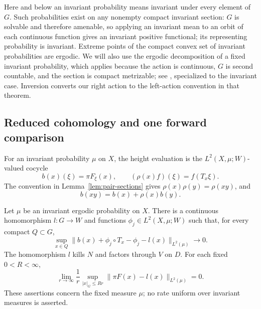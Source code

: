Here and below an invariant probability means invariant under every
element of $G$.  Such probabilities exist on any nonempty compact
invariant section: $G$ is solvable and therefore amenable, so applying
an invariant mean to an orbit of each continuous function gives an
invariant positive functional; its representing probability is
invariant.  Extreme points of the compact convex set of invariant
probabilities are ergodic.  We will also use the ergodic decomposition
of a fixed invariant probability, which applies because the action is
continuous, $G$ is second countable, and the section is compact
metrizable; see \cite[Theorem~5.2]{GreschonigSchmidt2000}, specialized
to the invariant case. Inversion converts our right action to the
left-action convention in that theorem.

\subsection{Reduced cohomology and one forward comparison}

For an invariant probability $\mu$ on $X$, the height evaluation is the
$L^2(X,\mu;W)$-valued cocycle
\[
 b(x)(\xi)=\pi F_\xi(x),\qquad
 (\rho(x)f)(\xi)=f(T_x\xi).
\]
The convention in Lemma~\ref{lem:pair-sections} gives
$\rho(x)\rho(y)=\rho(xy)$, and
\begin{equation}\label{eq:height-cocycle}
 b(xy)=b(x)+\rho(x)b(y).
\end{equation}

\begin{lemma}
\label{lem:cohomological-slope}
Let $\mu$ be an invariant ergodic probability on $X$.  There is a
continuous homomorphism $l:G\to W$ and functions
$\phi_j\in L^2(X,\mu;W)$ such that, for every compact $Q\subset G$,
\begin{equation}\label{eq:compact-coboundaries}
 \sup_{x\in Q}
 \bigl\|b(x)+\phi_j\circ T_x-\phi_j-l(x)\bigr\|_{L^2(\mu)}
 \longrightarrow0.
\end{equation}
The homomorphism $l$ kills $N$ and factors through $V$ on $D$.
For each fixed $0<R<\infty$,
\begin{equation}\label{eq:stationary-sublinear}
 \lim_{r\to\infty}\frac1r\sup_{|x|_G\le Rr}
 \|\pi F(x)-l(x)\|_{L^2(\mu)}=0.
\end{equation}
These assertions concern the fixed measure $\mu$; no rate uniform
over invariant measures is asserted.
\end{lemma}

